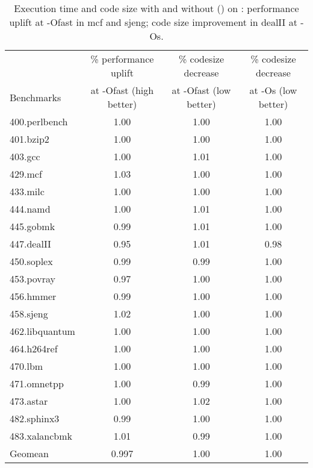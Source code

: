\documentclass[acmlarge,review,anonymous]{acmart}\settopmatter{printfolios=true}
\begin{document}
\begin{table}[h!]
  \begin{center}
    \begin{tabular}{|l|c|c|c|}
      \hline
                &\% performance uplift & \% codesize decrease & \% codesize decrease\\
Benchmarks      & at -Ofast (high better)& at -Ofast (low better) & at -Os (low better)\\\hline
400.perlbench	& 1.00  & 1.00 & 1.00\\\hline
401.bzip2	& 1.00  & 1.00 & 1.00\\\hline
403.gcc	        & 1.00  & 1.01 & 1.00\\\hline
429.mcf	        & 1.03  & 1.00 & 1.00\\\hline
433.milc	& 1.00  & 1.00 & 1.00\\\hline
444.namd	& 1.00  & 1.01 & 1.00\\\hline
445.gobmk	& 0.99  & 1.01 & 1.00\\\hline
447.dealII	& 0.95  & 1.01 & 0.98\\\hline
450.soplex	& 0.99  & 0.99 & 1.00\\\hline
453.povray	& 0.97  & 1.00 & 1.00\\\hline
456.hmmer	& 0.99  & 1.00 & 1.00\\\hline
458.sjeng	& 1.02  & 1.00 & 1.00\\\hline
462.libquantum	& 1.00  & 1.00 & 1.00\\\hline
464.h264ref	& 1.00  & 1.00 & 1.00\\\hline
470.lbm	        & 1.00  & 1.00 & 1.00\\\hline
471.omnetpp	& 1.00  & 0.99 & 1.00\\\hline
473.astar	& 1.00  & 1.02 & 1.00\\\hline
482.sphinx3	& 0.99  & 1.00 & 1.00\\\hline
483.xalancbmk	& 1.01  & 0.99 & 1.00\\\hline
Geomean         & 0.997 & 1.00 & 1.00\\\hline
    \end{tabular}
  \end{center}
  \caption{Execution time and code size with and without \gcm{}
    (\GCM{}) on \SPEC{}: performance uplift at -Ofast in mcf and sjeng; code size
    improvement in dealII at -Os.}
  \label{tab:code-size}
\end{table}
\end{document}
